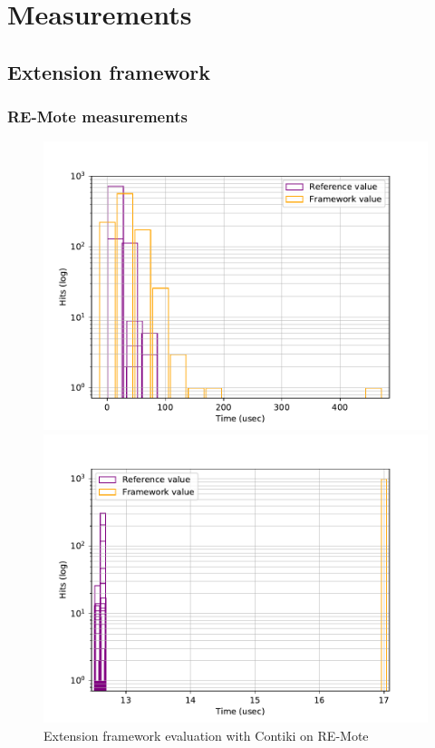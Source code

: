 \section{Measurements}

\subsection{Extension framework}

\subsubsection{RE-Mote measurements}



\begin{figure}[!ht]
  \begin{minipage}{.45\textwidth}
      \centering
      \includegraphics[scale=.4]{assets/comparison-extension-framework-contiki-remote.pdf}
      \caption{Extension framework evaluation with Contiki on RE-Mote\label{fig:comparison-extension-framework-contiki-remote}}
  \end{minipage}\hfill
  \begin{minipage}{.45\textwidth}        
      \centering
      \includegraphics[scale=.4]{assets/comparison-extension-framework-riot-remote.pdf}

\end{minipage}
\end{figure}
